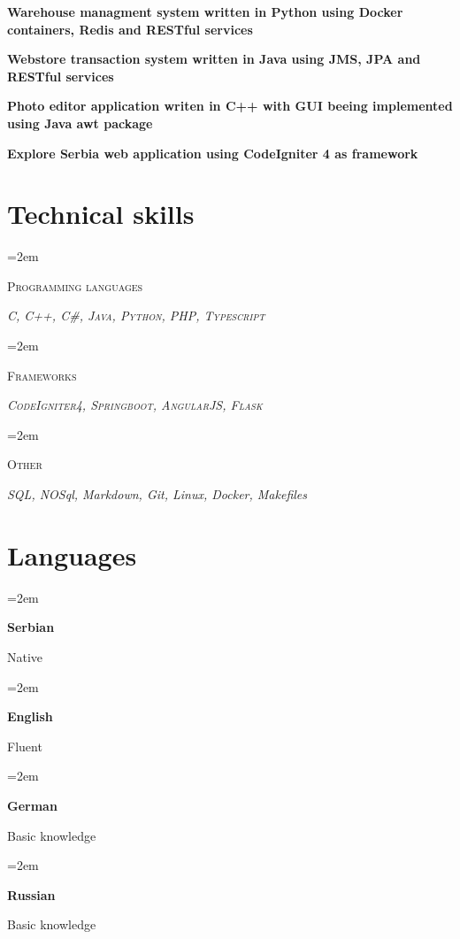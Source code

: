 \documentclass[12pt]{article}
\newlength{\spacebox}
\newcommand{\sepspace}{\vspace*{1em}}
\newcommand{\skill}[2]{
  \noindent\hangindent=2em\hangafter=0
  \parbox{3\spacebox}{%
    \textsc{#1}} %
  \textsl{#2} \par} %
\newcommand{\lan}[2]{
    \noindent\hangindent=2em\hangafter=0
    \parbox{\spacebox}{%
        \textbf{#1}} %
     #2 \par}    %
\newcommand{\project}[1]{

  \noindent  \textbf{#1}
  
\normalsize \par}
\begin{document}
\project{Warehouse managment system written in Python using Docker containers, Redis and RESTful services}

\project{Webstore transaction system written in Java using JMS, JPA and RESTful services}

\project{Photo editor application writen in C++ with GUI beeing implemented using Java awt package}

\project{Explore Serbia web application using CodeIgniter 4 as framework}


\sepspace

\section*{Technical skills}

\skill{Programming languages}{
  \textsc{C}, \textsc{C++}, \textsc{C\#}, \textsc{Java}, \textsc{Python}, \textsc{PHP}, \textsc{Typescript}}
\skill{Frameworks}{
  \textsc{CodeIgniter4}, \textsc{Springboot}, \textsc{AngularJS}, \textsc{Flask}}
\skill{Other}{
  \textsl{SQL, NOSql, Markdown, Git, Linux, Docker, Makefiles}}

\section*{Languages}
\lan{Serbian}{Native}
\lan{English}{Fluent}
\lan{German}{Basic knowledge}
\lan{Russian}{Basic knowledge}
\end{document}
